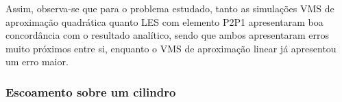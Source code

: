 Assim, observa-se que para o problema estudado, tanto as simulações VMS de aproximação quadrática quanto LES com elemento P2P1 apresentaram boa concordância com o resultado analítico, sendo que ambos apresentaram erros muito próximos entre si, enquanto o VMS de aproximação linear já apresentou um erro maior.

\subsubsection{Escoamento sobre um cilindro}
